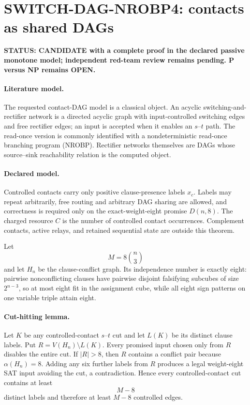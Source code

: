 \section*{SWITCH-DAG-NROBP4: contacts as shared DAGs}

\textbf{STATUS: CANDIDATE with a complete proof in the declared passive monotone model; independent red-team review remains pending. P versus NP remains OPEN.}

\paragraph{Literature model.}
The requested contact-DAG model is a classical object.  An acyclic
switching-and-rectifier network is a directed acyclic graph with input-controlled switching
edges and free rectifier edges; an input is accepted when it enables an $s$--$t$ path.
The read-once version is commonly identified with a nondeterministic read-once branching
program (NROBP).  Rectifier networks themselves are DAGs whose source--sink reachability
relation is the computed object.

\paragraph{Declared model.}
Controlled contacts carry only positive clause-presence labels $x_c$.  Labels may repeat
arbitrarily, free routing and arbitrary DAG sharing are allowed, and correctness is required
only on the exact-weight-eight promise $D(n,8)$.  The charged resource $C$ is the number of
controlled contact occurrences.  Complement contacts, active relays, and retained sequential
state are outside this theorem.

Let
\[
M=8\binom n3
\]
and let $H_n$ be the clause-conflict graph.  Its independence number is exactly eight:
pairwise nonconflicting clauses have pairwise disjoint falsifying subcubes of size
$2^{n-3}$, so at most eight fit in the assignment cube, while all eight sign patterns on
one variable triple attain eight.

\paragraph{Cut-hitting lemma.}
Let $K$ be any controlled-contact $s$--$t$ cut and let $L(K)$ be its distinct clause labels.
Put $R=V(H_n)\setminus L(K)$.  Every promised input chosen only from $R$ disables the
entire cut.  If $|R|>8$, then $R$ contains a conflict pair because
$\alpha(H_n)=8$.  Adding any six further labels from $R$ produces a legal weight-eight
SAT input avoiding the cut, a contradiction.  Hence every controlled-contact cut contains
at least
\[
M-8
\]
distinct labels and therefore at least $M-8$ controlled edges.

